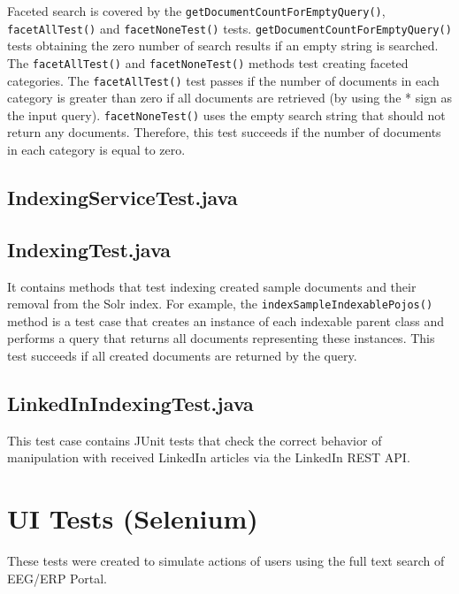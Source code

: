 Faceted search is covered by the \texttt{get\-Document\-Count\-For\-Empty\-Query()}, \texttt{facet\-All\-Test()} and \texttt{facet\-None\-Test()} tests.
\texttt{getDocumentCountForEmptyQuery()} tests obtaining the zero number of search results if an empty string is searched.
The \texttt{facet\-All\-Test()} and \texttt{facet\-None\-Test()} methods test creating faceted categories.
The \texttt{facetAllTest()} test passes if the number of documents in each category is greater than zero if all documents are retrieved (by using the * sign as the input query). 
\texttt{facetNoneTest()} uses the empty search string that should not return any documents. Therefore, this test succeeds if the number of documents in each category is equal to zero.

\subsection{IndexingServiceTest.java}

\subsection{IndexingTest.java}

It contains methods that test indexing created sample documents and their removal from the Solr index.
For example, the \texttt{indexSampleIndexablePojos()} method is a test case that creates an instance of each indexable parent class and performs a query that returns all documents representing these instances. This test succeeds if all created documents are returned by the query.

\subsection{LinkedInIndexingTest.java}

This test case contains JUnit tests that check the correct behavior of manipulation with received LinkedIn articles via the LinkedIn REST API.

\section{UI Tests (Selenium)}

These tests were created to simulate actions of users using the full text search of EEG/ERP Portal. 

